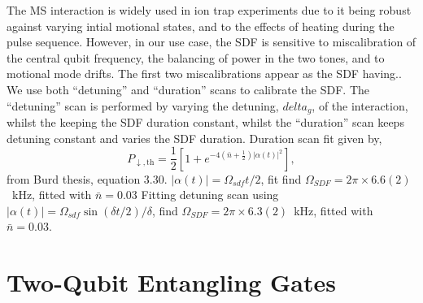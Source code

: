     The MS interaction is widely used in ion trap experiments due to it being robust against varying intial motional states, and to the effects of heating during the pulse sequence. However, in our use case, the SDF is sensitive to miscalibration of the central qubit frequency, the balancing of power in the two tones, and to motional mode drifts. The first two miscalibrations appear as the SDF having..
    We use both ``detuning'' and ``duration'' scans to calibrate the SDF. The
    ``detuning'' scan is performed by varying the detuning, $delta_g$, of the interaction, whilst the keeping the SDF duration constant, whilst the ``duration'' scan keeps detuning constant and varies the SDF duration.
    Duration scan fit given by,
    \begin{equation}
        P_{\downarrow,\mathrm{th}} = \frac{1}{2} \left[ 1 + e^{-4\left( \bar{n} + \frac{1}{2} \right) |\alpha(t)|^2} \right],
    \end{equation}
    from Burd thesis, equation 3.30.
    $|\alpha(t)| = \Omega_{sdf} t/2$, fit find $\Omega_{SDF} = 2\pi\times 6.6(2)$~kHz, fitted with $\bar{n} = 0.03$
    Fitting detuning scan using
    $|\alpha(t)| = \Omega_{sdf} \sin(\delta t/2)/\delta$, find $\Omega_{SDF} = 2\pi\times 6.3(2)$~kHz, fitted with $\bar{n} = 0.03$.



\section{Two-Qubit Entangling Gates}
\label{sec:Two-Qubit Entangling Gates}

